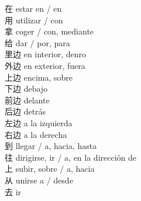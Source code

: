 在 \quad estar en / en\\
用 \quad utilizar / con\\
拿 \quad coger / con, mediante\\
给 \quad dar / por, para\\
里边 \quad en interior, denro\\
外边 \quad en exterior, fuera\\
上边 \quad encima, sobre\\
下边 \quad debajo\\
前边 \quad delante\\
后边 \quad detrás\\
左边 \quad a la izquierda\\
右边 \quad a la derecha\\
到 \quad llegar / a, hacia, hasta\\
往 \quad dirigirse, ir / a, en la dirección de\\
上 \quad subir, sobre / a, hacia\\
从 \quad unirse a / desde\\
去 \quad ir\\
